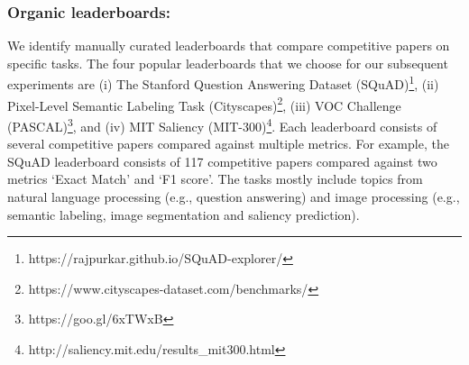 \documentclass[runningheads]{llncs}
\begin{document}

\subsubsection{Organic leaderboards:}
We identify manually curated leaderboards that compare competitive papers on specific tasks. The four popular leaderboards that we choose for our subsequent experiments are (i) The Stanford Question Answering Dataset (SQuAD)\footnote{https://rajpurkar.github.io/SQuAD-explorer/}, (ii) Pixel-Level Semantic Labeling Task (Cityscapes)\footnote{https://www.cityscapes-dataset.com/benchmarks/}, (iii) VOC Challenge (PASCAL)\footnote{https://goo.gl/6xTWxB}, and (iv) MIT Saliency (MIT-300)\footnote{http://saliency.mit.edu/results\_mit300.html}. 
Each leaderboard consists of several competitive papers compared against multiple metrics. For example, the SQuAD leaderboard consists of 117 competitive papers compared against two metrics `Exact Match' and `F1 score'.  
The tasks mostly include topics from natural language processing (e.g., question answering) and image processing (e.g., semantic labeling, image segmentation and saliency prediction).
\end{document}
